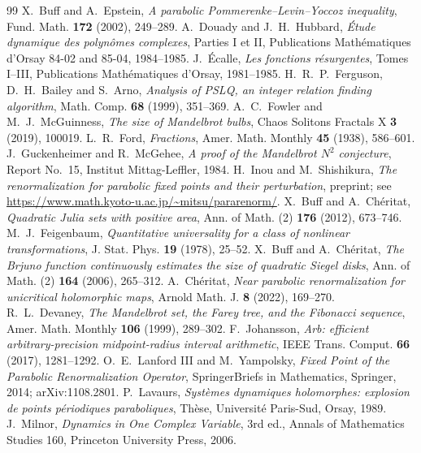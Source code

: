 \documentclass[11pt]{amsart}
\theoremstyle{definition}
\theoremstyle{remark}
\begin{document}
\begin{thebibliography}{99}
 X.~Buff and A.~Epstein, \emph{A parabolic Pommerenke--Levin--Yoccoz inequality}, Fund. Math. \textbf{172} (2002), 249--289.
 A.~Douady and J.~H.~Hubbard, \emph{\'Etude dynamique des polyn\^omes complexes}, Parties I et II, Publications Math\'ematiques d'Orsay 84-02 and 85-04, 1984--1985.
 J.~\'Ecalle, \emph{Les fonctions r\'esurgentes}, Tomes I--III, Publications Math\'ematiques d'Orsay, 1981--1985.
 H.~R.~P.~Ferguson, D.~H.~Bailey and S.~Arno, \emph{Analysis of PSLQ, an integer relation finding algorithm}, Math. Comp. \textbf{68} (1999), 351--369.
 A.~C.~Fowler and M.~J.~McGuinness, \emph{The size of Mandelbrot bulbs}, Chaos Solitons Fractals X \textbf{3} (2019), 100019.
 L.~R.~Ford, \emph{Fractions}, Amer. Math. Monthly \textbf{45} (1938), 586--601.
 J.~Guckenheimer and R.~McGehee, \emph{A proof of the Mandelbrot $N^2$ conjecture}, Report No.~15, Institut Mittag-Leffler, 1984.
 H.~Inou and M.~Shishikura, \emph{The renormalization for parabolic fixed points and their perturbation}, preprint; see \url{https://www.math.kyoto-u.ac.jp/~mitsu/pararenorm/}.
 X.~Buff and A.~Ch\'eritat, \emph{Quadratic Julia sets with positive area}, Ann. of Math. (2) \textbf{176} (2012), 673--746.
 M.~J.~Feigenbaum, \emph{Quantitative universality for a class of nonlinear transformations}, J. Stat. Phys. \textbf{19} (1978), 25--52.
 X.~Buff and A.~Ch\'eritat, \emph{The Brjuno function continuously estimates the size of quadratic Siegel disks}, Ann. of Math. (2) \textbf{164} (2006), 265--312.
 A.~Ch\'eritat, \emph{Near parabolic renormalization for unicritical holomorphic maps}, Arnold Math. J. \textbf{8} (2022), 169--270.
 R.~L.~Devaney, \emph{The Mandelbrot set, the Farey tree, and the Fibonacci sequence}, Amer. Math. Monthly \textbf{106} (1999), 289--302.
 F.~Johansson, \emph{Arb: efficient arbitrary-precision midpoint-radius interval arithmetic}, IEEE Trans. Comput. \textbf{66} (2017), 1281--1292.
 O.~E.~Lanford III and M.~Yampolsky, \emph{Fixed Point of the Parabolic Renormalization Operator}, SpringerBriefs in Mathematics, Springer, 2014; arXiv:1108.2801.
 P.~Lavaurs, \emph{Syst\`emes dynamiques holomorphes: explosion de points p\'eriodiques paraboliques}, Th\`ese, Universit\'e Paris-Sud, Orsay, 1989.
 J.~Milnor, \emph{Dynamics in One Complex Variable}, 3rd ed., Annals of Mathematics Studies 160, Princeton University Press, 2006.

\end{thebibliography}
\end{document}
